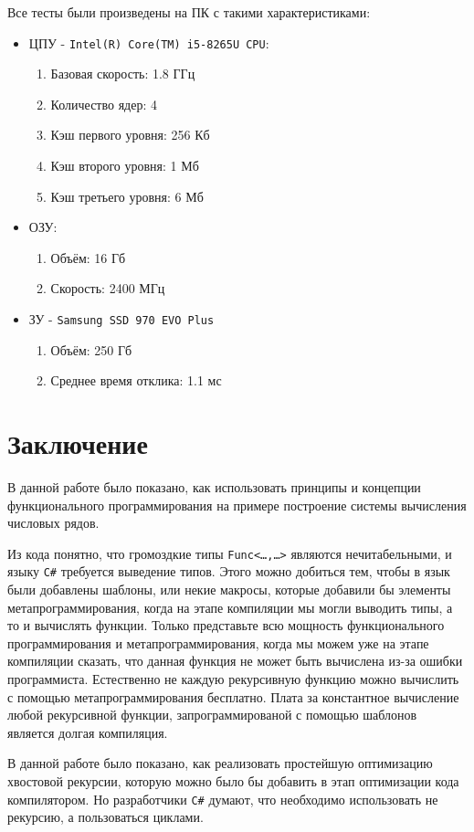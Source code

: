 Все тесты были произведены на ПК с такими характеристиками:

\begin{itemize}
	\item ЦПУ - \texttt{Intel(R) Core(TM) i5-8265U CPU}:
	\begin{enumerate}
		\item Базовая скорость: 1.8 ГГц
		\item Количество ядер: 4
		\item Кэш первого уровня: 256 Кб
		\item Кэш второго уровня: 1 Мб
		\item Кэш третьего уровня: 6 Мб
	\end{enumerate}
	\item ОЗУ:
	\begin{enumerate}
		\item Объём: 16 Гб
		\item Скорость: 2400 МГц
	\end{enumerate}
	\item ЗУ - \texttt{Samsung SSD 970 EVO Plus}
	\begin{enumerate}
		\item Объём: 250 Гб
		\item Среднее время отклика: 1.1 мс
	\end{enumerate}
\end{itemize}

\newpage
\section*{Заключение}
В данной работе было показано, как использовать принципы и концепции функционального программирования на примере построение системы вычисления числовых рядов.

Из кода понятно, что громоздкие типы \texttt{Func<\dots,\dots>} являются нечитабельными, и языку \texttt{C\#} требуется выведение типов.
Этого можно добиться тем, чтобы в язык были добавлены шаблоны, или некие макросы, которые добавили бы элементы метапрограммирования, когда на этапе компиляции мы могли выводить типы, а то и вычислять функции.
Только представьте всю мощность функционального программирования и метапрограммирования, когда мы можем уже на этапе компиляции сказать, что данная функция не может быть вычислена из-за ошибки программиста.
Естественно не каждую рекурсивную функцию можно вычислить с помощью метапрограммирования бесплатно.
Плата за константное вычисление любой рекурсивной функции, запрограммированой с помощью шаблонов является долгая компиляция.

В данной работе было показано, как реализовать простейшую оптимизацию хвостовой рекурсии, которую можно было бы добавить в этап оптимизации кода компилятором.
Но разработчики \texttt{C\#} думают, что необходимо использовать не рекурсию, а пользоваться циклами.
